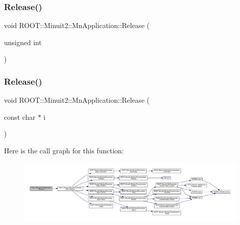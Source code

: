 \subsubsection{\texorpdfstring{Release()}{Release()}\hspace{0.1cm}{\footnotesize\ttfamily [3/6]}}
{\footnotesize\ttfamily void R\+O\+O\+T\+::\+Minuit2\+::\+Mn\+Application\+::\+Release (\begin{DoxyParamCaption}\item[{unsigned int}]{ }\end{DoxyParamCaption})}

\mbox{\label{classROOT_1_1Minuit2_1_1MnApplication_a399bc86275d6ea481911be4a4b48d83c}} 
\subsubsection{\texorpdfstring{Release()}{Release()}\hspace{0.1cm}{\footnotesize\ttfamily [4/6]}}
{\footnotesize\ttfamily void R\+O\+O\+T\+::\+Minuit2\+::\+Mn\+Application\+::\+Release (\begin{DoxyParamCaption}\item[{const char $\ast$}]{i }\end{DoxyParamCaption})}

Here is the call graph for this function\+:
\nopagebreak
\begin{figure}[H]
\begin{center}
\leavevmode
\includegraphics[width=350pt]{df/dd5/classROOT_1_1Minuit2_1_1MnApplication_a399bc86275d6ea481911be4a4b48d83c_cgraph}
\end{center}
\end{figure}
\mbox{\label{classROOT_1_1Minuit2_1_1MnApplication_a399bc86275d6ea481911be4a4b48d83c}} 
